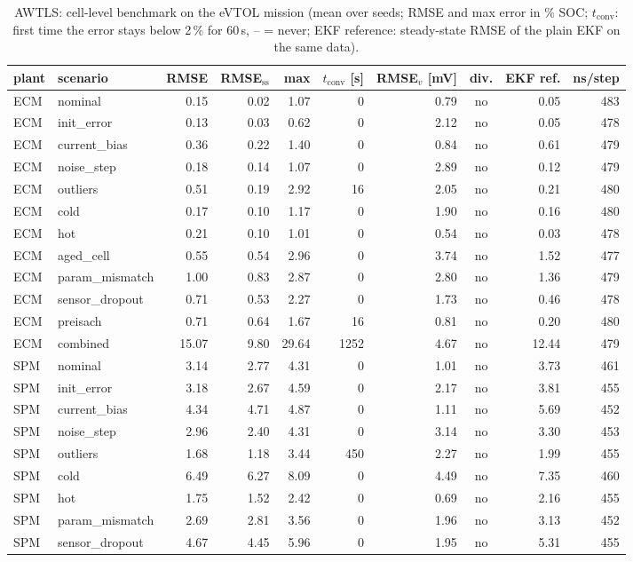 \begin{table}[H]\centering\footnotesize\setlength{\tabcolsep}{4pt}
\caption{AWTLS: cell-level benchmark on the eVTOL mission (mean over seeds; RMSE and max error in \% SOC; $t_\mathrm{conv}$: first time the error stays below 2\,\% for 60\,s, -- = never; EKF reference: steady-state RMSE of the plain EKF on the same data).}\label{tab:cell_AWTLS}
\begin{tabular}{llrrrrrcrr}\toprule
plant & scenario & RMSE & RMSE$_\mathrm{ss}$ & max & $t_\mathrm{conv}$ [s] & RMSE$_v$ [mV] & div. & EKF ref. & ns/step \\ \midrule
ECM & nominal & 0.15 & 0.02 & 1.07 & 0 & 0.79 & no & 0.05 & 483 \\
ECM & init\_error & 0.13 & 0.03 & 0.62 & 0 & 2.12 & no & 0.05 & 478 \\
ECM & current\_bias & 0.36 & 0.22 & 1.40 & 0 & 0.84 & no & 0.61 & 479 \\
ECM & noise\_step & 0.18 & 0.14 & 1.07 & 0 & 2.89 & no & 0.12 & 479 \\
ECM & outliers & 0.51 & 0.19 & 2.92 & 16 & 2.05 & no & 0.21 & 480 \\
ECM & cold & 0.17 & 0.10 & 1.17 & 0 & 1.90 & no & 0.16 & 480 \\
ECM & hot & 0.21 & 0.10 & 1.01 & 0 & 0.54 & no & 0.03 & 478 \\
ECM & aged\_cell & 0.55 & 0.54 & 2.96 & 0 & 3.74 & no & 1.52 & 477 \\
ECM & param\_mismatch & 1.00 & 0.83 & 2.87 & 0 & 2.80 & no & 1.36 & 479 \\
ECM & sensor\_dropout & 0.71 & 0.53 & 2.27 & 0 & 1.73 & no & 0.46 & 478 \\
ECM & preisach & 0.71 & 0.64 & 1.67 & 16 & 0.81 & no & 0.20 & 480 \\
ECM & combined & 15.07 & 9.80 & 29.64 & 1252 & 4.67 & no & 12.44 & 479 \\
\midrule
SPM & nominal & 3.14 & 2.77 & 4.31 & 0 & 1.01 & no & 3.73 & 461 \\
SPM & init\_error & 3.18 & 2.67 & 4.59 & 0 & 2.17 & no & 3.81 & 455 \\
SPM & current\_bias & 4.34 & 4.71 & 4.87 & 0 & 1.11 & no & 5.69 & 452 \\
SPM & noise\_step & 2.96 & 2.40 & 4.31 & 0 & 3.14 & no & 3.30 & 453 \\
SPM & outliers & 1.68 & 1.18 & 3.44 & 450 & 2.27 & no & 1.99 & 455 \\
SPM & cold & 6.49 & 6.27 & 8.09 & 0 & 4.49 & no & 7.35 & 460 \\
SPM & hot & 1.75 & 1.52 & 2.42 & 0 & 0.69 & no & 2.16 & 455 \\
SPM & param\_mismatch & 2.69 & 2.81 & 3.56 & 0 & 1.96 & no & 3.13 & 452 \\
SPM & sensor\_dropout & 4.67 & 4.45 & 5.96 & 0 & 1.95 & no & 5.31 & 455 \\
\bottomrule\end{tabular}\end{table}
